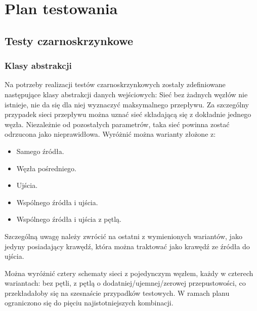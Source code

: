 \documentclass[10pt]{dokument-tiwo}
\begin{document}
\MakeDokumentMeta


\section{Plan testowania}
\subsection{Testy czarnoskrzynkowe}
\subsubsection{Klasy abstrakcji}
Na potrzeby realizacji testów czarnoskrzynkowych zostały zdefiniowane następujące klasy abstrakcji danych wejściowych:
Sieć bez żadnych węzłów nie istnieje, nie da się dla niej wyznaczyć maksymalnego przepływu.
Za szczególny przypadek sieci przepływu można uznać sieć składającą się z dokładnie jednego węzła. Niezależnie od pozostałych parametrów, taka sieć powinna zostać odrzucona jako nieprawidłowa. Wyróżnić można warianty złożone z:

\begin{itemize}
    \item Samego źródła.
    \item Węzła pośredniego.
    \item Ujścia.
    \item Wspólnego źródła i ujścia.
    \item Wspólnego źródła i ujścia z pętlą.
\end{itemize}
Szczególną uwagę należy zwrócić na ostatni z wymienionych wariantów, jako jedyny posiadający krawędź, która można traktować jako krawędź ze źródła do ujścia.

Można wyróżnić cztery schematy sieci z pojedynczym węzłem, każdy w czterech wariantach: bez pętli, z pętlą o dodatniej/ujemnej/zerowej przepustowości, co przekładałoby się na szesnaście przypadków testowych. W ramach planu ograniczono się do pięciu najistotniejszych kombinacji.
\end{document}
